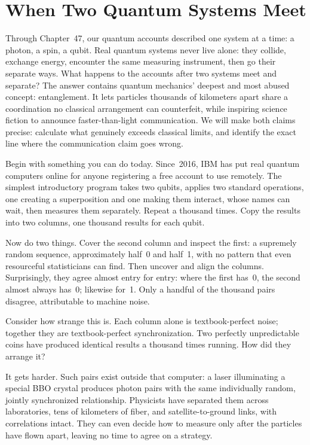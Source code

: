 \chapter{When Two Quantum Systems Meet}

Through Chapter~47, our quantum accounts described one system at a time: a photon, a spin, a qubit. Real quantum systems never live alone: they collide, exchange energy, encounter the same measuring instrument, then go their separate ways. What happens to the accounts after two systems meet and separate? The answer contains quantum mechanics' deepest and most abused concept: entanglement. It lets particles thousands of kilometers apart share a coordination no classical arrangement can counterfeit, while inspiring science fiction to announce faster-than-light communication. We will make both claims precise: calculate what genuinely exceeds classical limits, and identify the exact line where the communication claim goes wrong.


Begin with something you can do today. Since~2016, IBM has put real quantum computers online for anyone registering a free account to use remotely. The simplest introductory program takes two qubits, applies two standard operations, one creating a superposition and one making them interact, whose names can wait, then measures them separately. Repeat a thousand times. Copy the results into two columns, one thousand results for each qubit.

Now do two things. Cover the second column and inspect the first: a supremely random sequence, approximately half~0 and half~1, with no pattern that even resourceful statisticians can find. Then uncover and align the columns. Surprisingly, they agree almost entry for entry: where the first has~0, the second almost always has~0; likewise for~1. Only a handful of the thousand pairs disagree, attributable to machine noise.

Consider how strange this is. Each column alone is textbook-perfect noise; together they are textbook-perfect synchronization. Two perfectly unpredictable coins have produced identical results a thousand times running. How did they arrange it?

It gets harder. Such pairs exist outside that computer: a laser illuminating a special BBO crystal produces photon pairs with the same individually random, jointly synchronized relationship. Physicists have separated them across laboratories, tens of kilometers of fiber, and satellite-to-ground links, with correlations intact. They can even decide how to measure only after the particles have flown apart, leaving no time to agree on a strategy.

